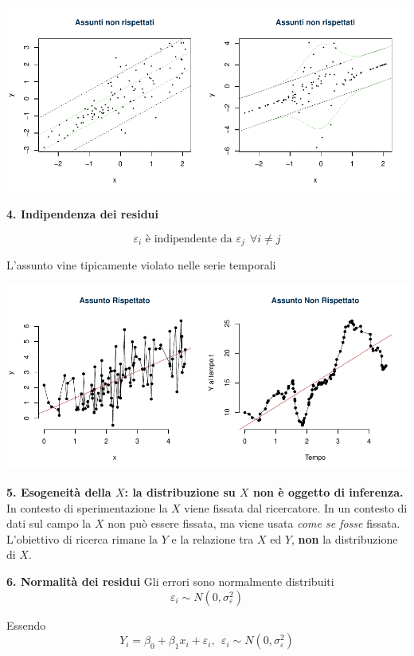 \documentclass[
  11pt,
]{book}
\theoremstyle{mytheoremstyle}
\theoremstyle{mydefstyle}
\begin{document}
\begin{center}\includegraphics{Appunti_di_Statistica_2025_files/figure-latex/17-regressione-I-24-1} \end{center}

\textbf{4. Indipendenza dei residui}

\[\varepsilon_i\text{ è indipendente da }\varepsilon_j~~\forall i\neq j\]

L'assunto vine tipicamente violato nelle serie temporali

\begin{center}\includegraphics{Appunti_di_Statistica_2025_files/figure-latex/17-regressione-I-26-1} \end{center}

\textbf{5. Esogeneità della \(X\): la distribuzione su \(X\) non è oggetto di inferenza.}
In contesto di sperimentazione la \(X\) viene fissata dal ricercatore.
In un contesto di dati sul campo la \(X\) non può essere fissata, ma viene usata
\emph{come se fosse} fissata.
L'obiettivo di ricerca rimane la \(Y\) e la relazione tra \(X\) ed \(Y\), \textbf{non}
la distribuzione di \(X\).

\textbf{6. Normalità dei residui}
Gli errori sono normalmente distribuiti
\[\varepsilon_i\sim N\left(0,\sigma_\varepsilon^2\right)\]

Essendo
\[Y_i = \beta_0+\beta_1x_i+\varepsilon_i, ~~\varepsilon_i\sim N\left(0,\sigma_\varepsilon^2\right)\]
\end{document}
